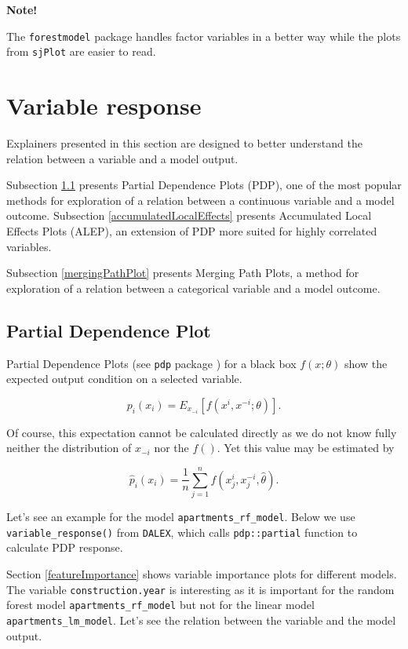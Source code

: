 \documentclass[]{book}
\theoremstyle{definition}
\theoremstyle{definition}
\theoremstyle{definition}
\theoremstyle{remark}
\begin{document}
\textbf{Note!}

The \texttt{forestmodel} package handles factor variables in a better
way while the plots from \texttt{sjPlot} are easier to read.

\hypertarget{variableResponse}{%
\section{Variable response}\label{variableResponse}}

Explainers presented in this section are designed to better understand
the relation between a variable and a model output.

Subsection \ref{pdpchapter} presents Partial Dependence Plots (PDP), one
of the most popular methods for exploration of a relation between a
continuous variable and a model outcome. Subsection
\ref{accumulatedLocalEffects} presents Accumulated Local Effects Plots
(ALEP), an extension of PDP more suited for highly correlated variables.

Subsection \ref{mergingPathPlot} presents Merging Path Plots, a method
for exploration of a relation between a categorical variable and a model
outcome.

\hypertarget{pdpchapter}{%
\subsection{Partial Dependence Plot}\label{pdpchapter}}

Partial Dependence Plots (see \texttt{pdp} package \citep{pdp}) for a
black box \(f(x; \theta)\) show the expected output condition on a
selected variable.

\[
p_i(x_i) = E_{x_{-i}}[ f(x^i, x^{-i}; \theta) ].
\]

Of course, this expectation cannot be calculated directly as we do not
know fully neither the distribution of \(x_{-i}\) nor the \(f()\). Yet
this value may be estimated by

\[
\hat p_i(x_i) = \frac{1}{n} \sum_{j=1}^{n} f(x^i_j, x_j^{-i}, \hat \theta).
\]

Let's see an example for the model \texttt{apartments\_rf\_model}. Below
we use \texttt{variable\_response()} from \texttt{DALEX}, which calls
\texttt{pdp::partial} function to calculate PDP response.

Section \ref{featureImportance} shows variable importance plots for
different models. The variable \texttt{construction.year} is interesting
as it is important for the random forest model
\texttt{apartments\_rf\_model} but not for the linear model
\texttt{apartments\_lm\_model}. Let's see the relation between the
variable and the model output.
\end{document}
